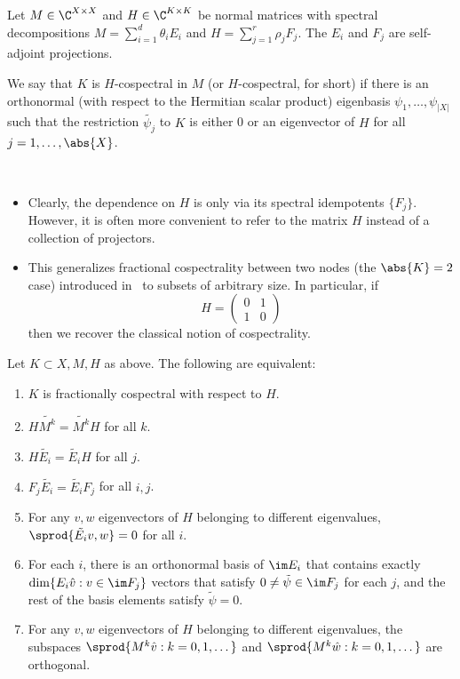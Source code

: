 Let $M \in \C^{X \times X}$ and $H \in \C^{K\times K}$ be normal matrices with spectral decompositions $M = \sum_{i=1}^d \theta_i E_i$ and $H = \sum_{j=1}^r \rho_j F_j$. The $E_i$ and $F_j$ are self-adjoint projections. 

\begin{defi}\label{def:cospectral}
We say that $K$ is $H$-cospectral in $M$ (or $H$-cospectral, for short) if there is an orthonormal (with respect to the Hermitian scalar product) eigenbasis $\psi_1, \dots, \psi_{|X|}$ such that the restriction $\tilde{\psi_j}$ to $K$ is either 0 or an eigenvector of $H$ for all $j = 1, \dots, \abs{X}$.\end{defi}

\begin{rema}~
\begin{itemize}
\item Clearly, the dependence on $H$ is only via its spectral idempotents $\{F_j\}$. However, it is often more convenient to refer to the matrix $H$ instead of a collection of projectors.
\item This generalizes fractional cospectrality between two nodes (the $\abs{K} =2$ case) introduced in~\cite{chan2020fundamentals} to subsets of arbitrary size. In particular, if \begin{equation}\label{eq:0110} H = \left( \begin{array}{cc} 0 & 1\\ 1 & 0 \end{array} \right)\end{equation} then we recover the classical notion of cospectrality.
\end{itemize}
\end{rema}

\begin{theorem}\label{thm:frac_cosp}
Let $K \subset X, M, H$ as above. The following are equivalent:
\begin{enumerate}
\item\label{it:frco} $K$ is fractionally cospectral with respect to $H$.
\item\label{it:HMk} $H \widetilde{M^k} = \widetilde{M^k} H$ for all $k$.
\item\label{it:HEi} $H \tilde{E_i} = \tilde{E_i} H$ for all $j$.
\item\label{it:FjEi} $F_j \tilde{E_i} = \tilde{E_i}F_j$ for all $i,j$.
\item\label{it:Eivw} For any $v,w$ eigenvectors of $H$ belonging to different eigenvalues, $\sprod{\tilde{E_i} v, w} = 0$ for all $i$.
\item\label{it:basisrk} For each $i$, there is an orthonormal basis of $\im E_i$ that contains exactly $\dim \{ E_i \hat{v} : v \in
\im F_j \}$ vectors that satisfy $0\neq \tilde{\psi} \in \im F_j $ for each $j$, and the rest of the basis elements satisfy $\tilde{\psi} = 0$.
\item\label{it:Mkw} For any $v,w$ eigenvectors of $H$ belonging to different eigenvalues, the subspaces $\sprod{M^k \hat{v} : k=0,1,\dots}$ and $\sprod{M^k \hat{w} : k=0,1,\dots}$ are orthogonal.
\end{enumerate}
\end{theorem}

